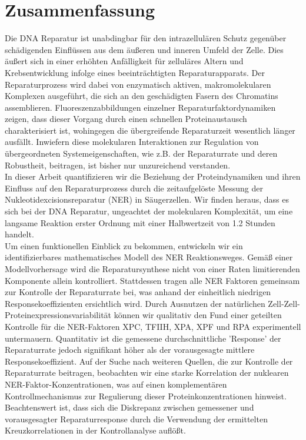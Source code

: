\chapter*{Zusammenfassung}
\thispagestyle{plain2}


Die DNA Reparatur ist unabdingbar f\"{u}r den intrazellul\"{a}ren Schutz gegen\"{u}ber sch\"{a}digenden Einfl\"{u}ssen aus dem \"{a}u\ss{}eren und inneren Umfeld der Zelle. Dies \"{a}u\ss{}ert sich in einer erh\"{o}hten Anf\"{a}lligkeit f\"{u}r zellul\"{a}res Altern und Krebsentwicklung infolge eines beeintr\"{a}chtigten Reparaturapparats. Der Reparaturprozess wird dabei von enzymatisch aktiven, makromolekularen Komplexen ausgef\"{u}hrt, die sich an den gesch\"{a}digten Fasern des Chromatins assemblieren. Fluoreszenzabbildungen einzelner Reparaturfaktordynamiken zeigen, dass dieser Vorgang durch einen schnellen Proteinaustausch charakterisiert ist, wohingegen die \"{u}bergreifende Reparaturzeit wesentlich l\"{a}nger ausf\"{a}llt. Inwiefern diese molekularen Interaktionen zur Regulation von \"{u}bergeordneten Systemeigenschaften, wie z.B. der Reparaturrate und deren Robustheit, beitragen, ist bisher nur unzureichend verstanden.\\
In dieser Arbeit quantifizieren wir die Beziehung der Proteindynamiken und ihren Einfluss auf den Reparaturprozess durch die zeitaufgel\"{o}ste Messung der Nukleotidexcisionsreparatur (NER) in S\"{a}ugerzellen. Wir finden heraus, dass es sich bei der DNA Reparatur, ungeachtet der molekularen Komplexit\"{a}t, um eine langsame Reaktion erster Ordnung mit einer Halb\-wertzeit von 1.2 Stunden handelt.\\  
Um einen funktionellen Einblick zu bekommen, entwickeln wir ein identifizierbares ma\-the\-matisches Modell des NER Reaktionsweges. Gem\"{a}\ss{} einer Modellvorhersage wird die Reparatursynthese nicht von einer Raten limitierenden Komponente allein kontrolliert. Stattdessen tragen alle NER Faktoren gemeinsam zur Kontrolle der Reparaturrate bei, was anhand der einheitlich niedrigen Responsekoeffizienten ersichtlich wird. Durch Ausnutzen der nat\"{u}rlichen Zell-Zell-Proteinexpressionsvariabilit\"{a}t k\"{o}nnen wir qualitativ den Fund einer geteilten Kontrolle f\"{u}r die NER-Faktoren XPC, TFIIH, XPA, XPF und RPA experimentell untermauern. Quantitativ ist die gemessene durchschnittliche 'Response' der Reparaturrate jedoch signifikant h\"{o}her als der vorausgesagte mittlere Responsekoeffizient. Auf der Suche nach weiteren Quellen, die zur Kontrolle der Reparaturrate beitragen, beobachten wir eine starke Korrelation der nuklearen NER-Faktor-Konzentrationen, was auf einen komplement\"{a}ren Kontrollmechanismus zur Regulierung dieser Proteinkonzentrationen hinweist. Beachtenswert ist, dass sich die Diskrepanz zwischen gemessener und vorausgesagter Reparaturresponse durch die Verwendung der ermittelten Kreuzkorrelationen in der Kontrollanalyse aufl\"{o}\ss{}t.\\              
